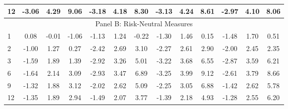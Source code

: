 \documentclass[11pt]{article}
\begin{document}
\begin{table}
\begin{center}
\begin{tabular}{lllllllllllll}
12 & \multicolumn{1}{c}{-3.06} & \multicolumn{1}{c}{4.29} & \multicolumn{1}{c}{9.06} & \multicolumn{1}{c}{-3.18} & \multicolumn{1}{c}{4.18} & \multicolumn{1}{c}{8.30} & \multicolumn{1}{c}{-3.13} & \multicolumn{1}{c}{4.24} & \multicolumn{1}{c}{8.61} & \multicolumn{1}{c}{-2.97} & \multicolumn{1}{c}{4.10} & \multicolumn{1}{c}{8.06} \\
\hline
\multicolumn{13}{c}{Panel B: Risk-Neutral Measures} \\
\hline
1 & \multicolumn{1}{c}{0.08} & \multicolumn{1}{c}{-0.01} & \multicolumn{1}{c}{-1.06} & \multicolumn{1}{c}{-1.13} & \multicolumn{1}{c}{1.24} & \multicolumn{1}{c}{-0.22} & \multicolumn{1}{c}{-1.30} & \multicolumn{1}{c}{1.46} & \multicolumn{1}{c}{0.15} & \multicolumn{1}{c}{-1.48} & \multicolumn{1}{c}{1.70} & \multicolumn{1}{c}{0.51} \\
2 & \multicolumn{1}{c}{-1.00} & \multicolumn{1}{c}{1.27} & \multicolumn{1}{c}{0.27} & \multicolumn{1}{c}{-2.42} & \multicolumn{1}{c}{2.69} & \multicolumn{1}{c}{3.10} & \multicolumn{1}{c}{-2.27} & \multicolumn{1}{c}{2.61} & \multicolumn{1}{c}{2.90} & \multicolumn{1}{c}{-2.00} & \multicolumn{1}{c}{2.45} & \multicolumn{1}{c}{2.35} \\
3 & \multicolumn{1}{c}{-1.59} & \multicolumn{1}{c}{1.89} & \multicolumn{1}{c}{1.39} & \multicolumn{1}{c}{-2.92} & \multicolumn{1}{c}{3.26} & \multicolumn{1}{c}{5.01} & \multicolumn{1}{c}{-3.22} & \multicolumn{1}{c}{3.68} & \multicolumn{1}{c}{6.55} & \multicolumn{1}{c}{-2.87} & \multicolumn{1}{c}{3.59} & \multicolumn{1}{c}{6.21} \\
6 & \multicolumn{1}{c}{-1.64} & \multicolumn{1}{c}{2.14} & \multicolumn{1}{c}{3.09} & \multicolumn{1}{c}{-2.93} & \multicolumn{1}{c}{3.47} & \multicolumn{1}{c}{6.89} & \multicolumn{1}{c}{-3.25} & \multicolumn{1}{c}{3.99} & \multicolumn{1}{c}{9.12} & \multicolumn{1}{c}{-2.61} & \multicolumn{1}{c}{3.79} & \multicolumn{1}{c}{8.66} \\
9 & \multicolumn{1}{c}{-1.32} & \multicolumn{1}{c}{1.88} & \multicolumn{1}{c}{3.12} & \multicolumn{1}{c}{-2.02} & \multicolumn{1}{c}{2.62} & \multicolumn{1}{c}{5.09} & \multicolumn{1}{c}{-2.25} & \multicolumn{1}{c}{3.05} & \multicolumn{1}{c}{6.88} & \multicolumn{1}{c}{-1.42} & \multicolumn{1}{c}{2.62} & \multicolumn{1}{c}{5.78} \\
12 & \multicolumn{1}{c}{-1.35} & \multicolumn{1}{c}{1.89} & \multicolumn{1}{c}{2.94} & \multicolumn{1}{c}{-1.49} & \multicolumn{1}{c}{2.07} & \multicolumn{1}{c}{3.77} & \multicolumn{1}{c}{-1.39} & \multicolumn{1}{c}{2.18} & \multicolumn{1}{c}{4.93} & \multicolumn{1}{c}{-1.28} & \multicolumn{1}{c}{2.55} & \multicolumn{1}{c}{6.20} \\

\end{tabular}
\end{center}
\end{table}
\end{document}
